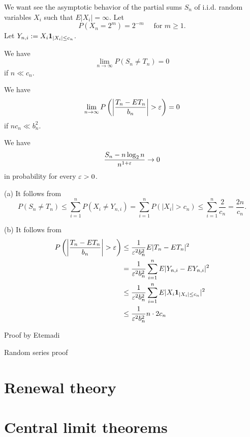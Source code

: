 \documentclass{../note}
\begin{document}
\begin{prb}
We want see the asymptotic behavior of the partial sums $S_n$ of i.i.d. random variables $X_i$ such that $E|X_i|=\infty$.
Let
\[P(X_n=2^m)=2^{-m}\quad\text{ for }m\ge1.\]
Let $Y_{n,i}:=X_i\mathbf{1}_{|X_i|\le c_n}$.
\begin{parts}
\item We have
\[\lim_{n\to\infty}P(S_n\ne T_n)=0\]
if $n\ll c_n$.
\item We have
\[\lim_{n\to\infty}P\left(\left|\frac{T_n-ET_n}{b_n}\right|>\e\right)=0\]
if $nc_n\ll b_n^2$.
\item We have
\[\frac{S_n-n\log_2n}{n^{1+\varepsilon}}\to0\]
in probability for every $\varepsilon>0$.
\end{parts}
\end{prb}
\begin{pf}
(a)
It follows from
\[P(S_n\ne T_n)
\le\sum_{i=1}^nP(X_i\ne Y_{n,i})
=\sum_{i=1}^nP(|X_i|>c_n)
\le\sum_{i=1}^n\frac2{c_n}=\frac{2n}{c_n}.\]

(b)
It follows from
\begin{align*}
P\left(\left|\frac{T_n-ET_n}{b_n}\right|>\e\right)
&\le\frac1{\e^2b_n^2}E|T_n-ET_n|^2\\
&=\frac1{\e^2b_n^2}\sum_{i=1}^nE|Y_{n,i}-EY_{n,i}|^2\\
&\le\frac1{\e^2b_n^2}\sum_{i=1}^nE|X_i\1_{|X_i|\le c_n}|^2\\
&\le\frac1{\e^2b_n^2}n\cdot2c_n
\end{align*}

\end{pf}



\begin{prb}
\end{prb}

\begin{prb}
\end{prb}

\begin{prb}
Proof by Etemadi
\end{prb}

Random series proof

\section{Renewal theory}





\section{Central limit theorems}
\end{document}
